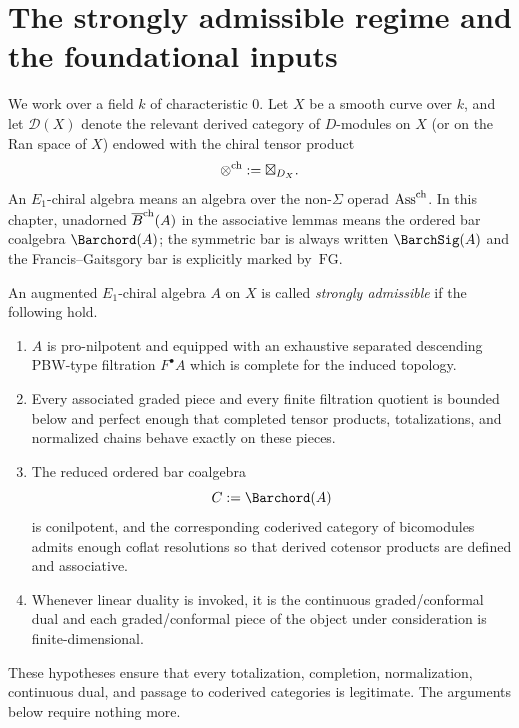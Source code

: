 \section{The strongly admissible regime and the foundational inputs}
\label{sec:setup}

We work over a field $k$ of characteristic $0$. Let $X$ be a smooth curve over $k$, and let
$\mathcal D(X)$ denote the relevant derived category of $D$-modules on $X$ (or on the Ran space of
$X$) endowed with the chiral tensor product
\[
\mathbin{\otimes^{\mathrm{ch}}} := \boxtimes_{D_X}.
\]
An $E_1$-chiral algebra means an algebra over the non-$\Sigma$ operad $\mathrm{Ass}^{\mathrm{ch}}$.
In this chapter, unadorned $\overline{B}^{\mathrm{ch}}(A)$ in the associative lemmas means
the ordered bar coalgebra $\Barchord(A)$; the symmetric bar is always
written $\BarchSig(A)$ and the Francis--Gaitsgory bar is explicitly
marked by~$\mathrm{FG}$.

\begin{definition}
An augmented $E_1$-chiral algebra $A$ on $X$ is called \emph{strongly admissible} if the following
hold.
\begin{enumerate}[label=(\alph*)]
\item $A$ is pro-nilpotent and equipped with an exhaustive separated descending PBW-type filtration
$F^\bullet A$ which is complete for the induced topology.

\item Every associated graded piece and every finite filtration quotient is bounded below and perfect
enough that completed tensor products, totalizations, and normalized chains behave exact\-ly on these
pieces.

\item The reduced ordered bar coalgebra
\[
C:=\Barchord(A)
\]
is conilpotent, and the corresponding coderived category of bicomodules admits enough coflat
resolutions so that derived cotensor products are defined and associative.

\item Whenever linear duality is invoked, it is the continuous graded/conformal dual and each
graded/conformal piece of the object under consideration is finite-dimensional.
\end{enumerate}
\end{definition}

\begin{remark}
These hypotheses ensure that every totalization, completion, normalization, continuous dual, and
passage to coderived categories is legitimate. The arguments below require nothing more.
\end{remark}

